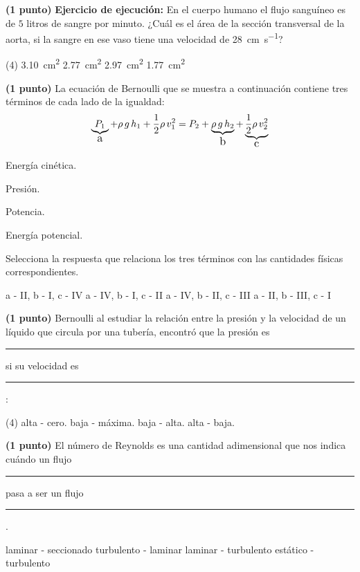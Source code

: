 \documentclass[12pt, letter]{exam}
\begin{document}
\begin{questions}
    \question \textbf{(1 punto)} \label{Problema_03} \textbf{Ejercicio de ejecución: } En el cuerpo humano el flujo sanguíneo es de $5$ litros de sangre por minuto. ¿Cuál es el área de la sección transversal de la aorta, si la sangre en ese vaso tiene una velocidad de \SI{28}{\centi\meter\per\second}?
    \begin{tasks}(4)
        \task \SI{3.10}{\square\centi\meter}
        \task \SI{2.77}{\square\centi\meter}
        \task \SI{2.97}{\square\centi\meter}
        \task \SI{1.77}{\square\centi\meter}
    \end{tasks}
    \question \textbf{(1 punto)} La ecuación de Bernoulli que se muestra a continuación contiene tres términos de cada lado de la igualdad:
    \begin{align*}
    \underbrace{P_{1}}_{\text{\large{a}}} + \rho \, g \, h_{1} + \dfrac{1}{2} \rho \, v_{1}^{2} = P_{2} + \underbrace{\rho \, g \, h_{2}}_{\text{\large{b}}} + \underbrace{\dfrac{1}{2} \rho \, v_{2}^{2}}_{\text{\large{c}}}
    \end{align*}
        
    \vspace{0.5em}
    \begin{inparaenum}[I)]
            \item Energía cinética. \quad \quad
            \item Presión. \quad \quad
            \item Potencia. \quad \quad
            \item Energía potencial. \quad \quad
    \end{inparaenum}

    Selecciona la respuesta que relaciona los tres términos con las cantidades físicas correspondientes.
    \begin{tasks}
        \task a - II, b - I, c - IV
        \task a - IV, b - I, c - II
        \task a - IV, b - II, c - III
        \task a - II, b - III, c - I
    \end{tasks}
    \question \textbf{(1 punto)} Bernoulli al estudiar la relación entre la presión y la velocidad de un líquido que circula por una tubería, encontró que la presión es \rule{2cm}{0.1mm} si su velocidad es \rule{2cm}{0.1mm}:
    \begin{tasks}(4)
        \task alta - cero.
        \task baja - máxima.
        \task baja - alta.
        \task alta - baja.
    \end{tasks}
    \question \textbf{(1 punto)} El número de Reynolds es una cantidad adimensional que nos indica cuándo un flujo \rule{2cm}{0.1mm} pasa a ser un flujo \rule{2cm}{0.1mm}.
    \begin{tasks}
        \task laminar - seccionado
        \task turbulento - laminar
        \task laminar  - turbulento
        \task estático - turbulento
    \end{tasks}


\end{questions}
\end{document}
